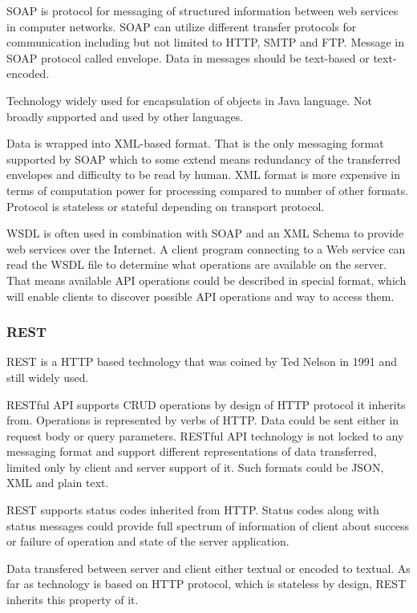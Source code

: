 \documentclass[thesis=M,english]{FITthesis}[2012/10/20]
\begin{document}
SOAP is protocol for messaging of structured information between web services in computer networks.
SOAP can utilize different transfer protocols for communication including but not limited to HTTP, SMTP and FTP. Message in SOAP protocol called envelope.
Data in messages should be text-based or text-encoded.

Technology widely used for encapsulation of objects in Java language. Not broadly supported and used by other languages.

Data is wrapped into XML-based format. That is the only messaging format supported by SOAP which to some extend means redundancy of the transferred envelopes and difficulty to be read by human. XML format is more expensive in terms of computation power for processing compared to number of other formats.
Protocol is stateless or stateful depending on transport protocol.

WSDL is often used in combination with SOAP and an XML Schema to provide web services over the Internet. A client program connecting to a Web service can read the WSDL file to determine what operations are available on the server. That means available API operations could be described in special format, which will enable clients to discover possible API operations and way to access them.


\subsubsection{REST}

REST is a HTTP based technology that was coined by Ted Nelson in 1991 and still widely used. 

RESTful \cite{restapidesign} API supports CRUD operations by design of HTTP protocol it inherits from. Operations is represented by verbs of HTTP. Data could be sent either in request body or query parameters. RESTful API technology is not locked to any messaging format and support different representations of data transferred, limited only by client and server support of it. Such formats could be  JSON, XML and plain text.

REST supports status codes inherited from HTTP. Status codes along with status messages could provide full spectrum of information of client about success or failure of operation and state of the server application.

Data transfered between server and client either textual or encoded to textual. As far as technology is based on HTTP protocol, which is stateless by design, REST inherits this property of it.
\end{document}
